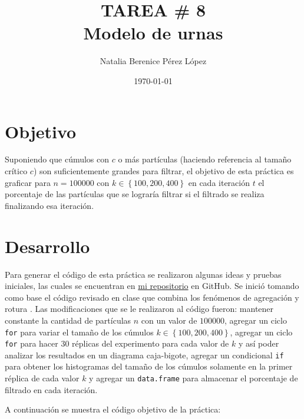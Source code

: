 \documentclass{article}
\title{TAREA \# 8 \\ Modelo de urnas} %
\author{Natalia Berenice P\'{e}rez L\'{o}pez} %
\date{\today}
\begin{document}

\maketitle %

\section{Objetivo}
Suponiendo que cúmulos con $c$ o más partículas (haciendo referencia al tamaño crítico $c$) son suficientemente grandes para filtrar, el objetivo de esta práctica es graficar para $n = 100000$ con $k \in \left\lbrace{100, 200, 400}\right\rbrace$ en cada iteración $t$ el porcentaje de las partículas que se lograría filtrar si el filtrado se realiza finalizando esa iteración.

\section{Desarrollo} %
Para generar el código de esta práctica se realizaron algunas ideas y pruebas iniciales, las cuales se encuentran en \href{https://github.com/nataliaperez0/Simulation/tree/main/Tarea8}{mi repositorio}  en GitHub. Se inició tomando como base el código revisado en clase que combina los fenómenos de agregación y rotura \citep{1}. Las modificaciones que se le realizaron al código fueron: mantener constante la cantidad de partículas $n$ con un valor de $100000$, agregar un ciclo \texttt{for} para variar el tamaño de los cúmulos $k \in \left\lbrace{100, 200, 400}\right\rbrace$, agregar un ciclo \texttt{for} para hacer 30 réplicas del experimento para cada valor de $k$ y así poder analizar los resultados en un diagrama caja-bigote, agregar un condicional \texttt{if} para obtener los histogramas del tamaño de los cúmulos solamente en la primer réplica de cada valor $k$ y agregar un \texttt{data.frame} para almacenar el porcentaje de filtrado en cada iteración.
\bigskip

A continuación se muestra el código objetivo de la práctica:


\end{document}
